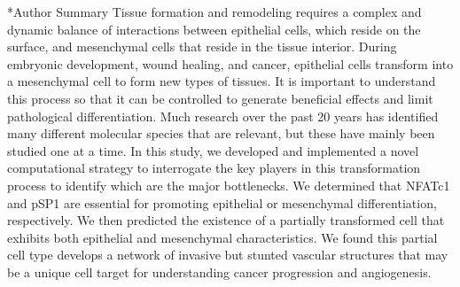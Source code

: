 \documentclass[12pt]{article}
\makeatletter
\renewcommand\section{\@startsection
	{subsection}{2}{0mm}
	{-0.2in}
	{0.05\baselineskip}
	{\normalfont\large\bfseries}}
\makeatother
\begin{document}
\section*{Author Summary}
Tissue formation and remodeling requires a complex and dynamic balance of interactions between epithelial cells, which reside on the surface, and mesenchymal cells that reside in the tissue interior. During embryonic development, wound healing, and cancer, epithelial cells transform into a mesenchymal cell to form new types of tissues.
It is important to understand this process so that it can be controlled to generate beneficial effects and limit pathological differentiation.
Much research over the past 20 years has identified many different molecular species that are relevant, but these have mainly been studied one at a time.
In this study, we developed and implemented a novel computational strategy to interrogate the key players in this transformation process to identify which are the major bottlenecks.
We determined that NFATc1 and pSP1 are essential for promoting epithelial or mesenchymal differentiation, respectively.
We then predicted the existence of a partially transformed cell that exhibits both epithelial and mesenchymal characteristics.
We found this partial cell type develops a network of invasive but stunted vascular structures that may be a unique cell target for understanding cancer progression and angiogenesis.
\end{document}
